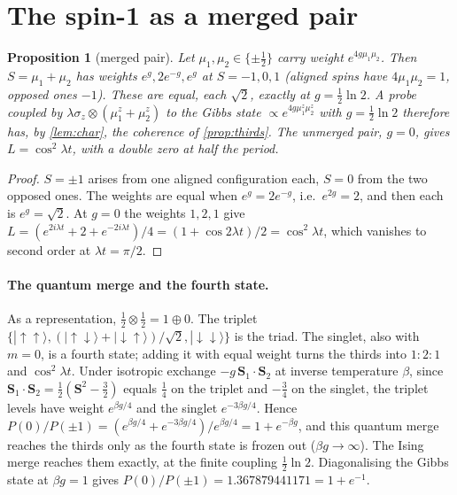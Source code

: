 \documentclass[11pt]{article}
\newtheorem{proposition}[theorem]{Proposition}
\theoremstyle{definition}\newtheorem{definition}[theorem]{Definition}
\theoremstyle{remark}\newtheorem{remark}[theorem]{Remark}
\begin{document}
\section{The spin-1 as a merged pair}\label{sec:merge}
\begin{proposition}[merged pair]\label{prop:merge}
Let $\mu_1,\mu_2\in\{\pm\frac12\}$ carry weight $e^{4g\mu_1\mu_2}$. Then $S=\mu_1+\mu_2$ has weights $e^g,2e^{-g},e^g$ at $S=-1,0,1$ (aligned spins have $4\mu_1\mu_2=1$, opposed ones $-1$). These are equal, each $\sqrt2$, exactly at $g=\frac12\ln2$. A probe coupled by $\lambda\sigma_z\otimes(\mu_1^z+\mu_2^z)$ to the Gibbs state $\propto e^{4g\mu_1^z\mu_2^z}$ with $g=\frac12\ln2$ therefore has, by \cref{lem:char}, the coherence of \cref{prop:thirds}. The unmerged pair, $g=0$, gives $L=\cos^2\lambda t$, with a double zero at half the period.
\end{proposition}
\begin{proof}
$S=\pm1$ arises from one aligned configuration each, $S=0$ from the two opposed ones. The weights are equal when $e^g=2e^{-g}$, i.e.\ $e^{2g}=2$, and then each is $e^g=\sqrt2$. At $g=0$ the weights $1,2,1$ give $L=(e^{2i\lambda t}+2+e^{-2i\lambda t})/4=(1+\cos2\lambda t)/2=\cos^2\lambda t$, which vanishes to second order at $\lambda t=\pi/2$.
\end{proof}
\paragraph{The quantum merge and the fourth state.} As a representation, $\frac12\otimes\frac12=1\oplus0$. The triplet $\{|{\uparrow\uparrow}\rangle,(|{\uparrow\downarrow}\rangle+|{\downarrow\uparrow}\rangle)/\sqrt2,|{\downarrow\downarrow}\rangle\}$ is the triad. The singlet, also with $m=0$, is a fourth state; adding it with equal weight turns the thirds into $1{:}2{:}1$ and $\cos^2\lambda t$. Under isotropic exchange $-g\,\mathbf S_1\!\cdot\!\mathbf S_2$ at inverse temperature $\beta$, since $\mathbf S_1\!\cdot\!\mathbf S_2=\frac12(\mathbf S^2-\frac32)$ equals $\frac14$ on the triplet and $-\frac34$ on the singlet, the triplet levels have weight $e^{\beta g/4}$ and the singlet $e^{-3\beta g/4}$. Hence $P(0)/P(\pm1)=(e^{\beta g/4}+e^{-3\beta g/4})/e^{\beta g/4}=1+e^{-\beta g}$, and this quantum merge reaches the thirds only as the fourth state is frozen out ($\beta g\to\infty$). The Ising merge reaches them exactly, at the finite coupling $\frac12\ln2$. Diagonalising the Gibbs state at $\beta g=1$ gives $P(0)/P(\pm1)=1.367879441171=1+e^{-1}$.
\end{document}
